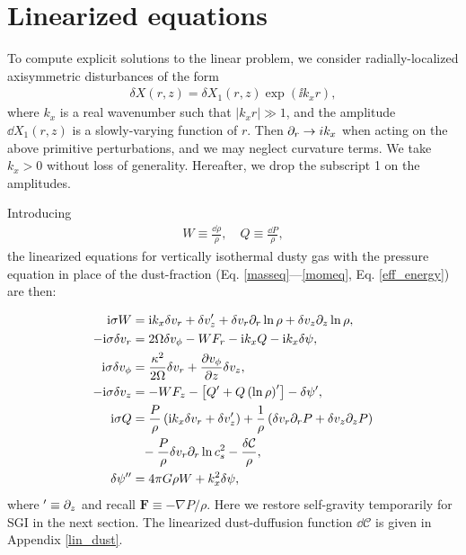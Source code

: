 \section{Linearized equations}\label{linear_problem}
To compute explicit solutions to the linear problem, 
we consider radially-localized axisymmetric disturbances of the form  
\begin{align}
  \delta X (r, z) = \delta X_1(r,z)\exp{(\ii k_x r)},
\end{align} 
where $k_x$ is a real wavenumber such that $|k_xr|\gg 1$, and the 
amplitude $\dd X_1(r,z)$ is 
a slowly-varying function of $r$. Then 
$\partial_r\to i k_x$ when acting on the above primitive perturbations, and we may
neglect curvature terms. We take  
$k_x>0$ without loss of generality. Hereafter, we drop the subscript 1
on the amplitudes. 

Introducing 
\begin{align}
  W \equiv \frac{\dd\rho}{\rho}, \quad Q \equiv \frac{\dd P}{\rho},
\end{align}
the linearized equations for 
vertically isothermal dusty gas with the pressure
equation in place of the dust-fraction
(Eq. \ref{masseq}---\ref{momeq}, Eq. \ref{eff_energy}) are then:    

\begin{align}
  \ii\sigma W &= \ii k_x \dd v_r + \dd v_z^\prime +
  \dd v_r \p_r\ln{\rho} + \dd v_z\p_z\ln{\rho},\label{lin_mass}\\
  -\ii\sigma\dd v_r  &= 2\Omega\dd v_\phi 
- W F_r - \ii k_x Q - \ii k_x\dd\psi,\label{lin_xmom}\\
  \ii\sigma\dd v_\phi &= \frac{\kappa^2}{2\Omega}\dd v_r + \frac{\p
    v_\phi}{\p z}\dd v_z, \label{lin_ymom}\\
  -\ii\sigma\dd v_z &= - W F_z - \left[Q^\prime + Q
    \left(\ln{\rho}\right)^\prime\right] - \dd\psi^\prime  %
,\label{lin_zmom}\\
  \ii\sigma Q &= \frac{P}{\rho}\left(\ii k_x \dd v_r + \dd
               v_z^\prime\right) + \frac{1}{\rho}\left(\dd v_r\p_rP + \dd v_z \p_zP\right)\notag\\
                &\phantom{=}-\frac{P}{\rho} \dd v_r\p_r
               \ln{c_s^2} %
               - \frac{\dd\mathcal{C}}{\rho},\label{lin_energy}\\
\dd\psi^{\prime\prime}  &= 4\pi G \rho W + k_x^2\dd\psi, \label{lin_sg}
\end{align}  
where $^\prime \equiv \partial_z$ and recall $\bm{F} \equiv -\nabla
P/\rho$. Here we restore self-gravity temporarily for SGI in the next
section. The linearized dust-duffusion function 
$\dd\mathcal{C}$ is given in  Appendix \ref{lin_dust}. 

